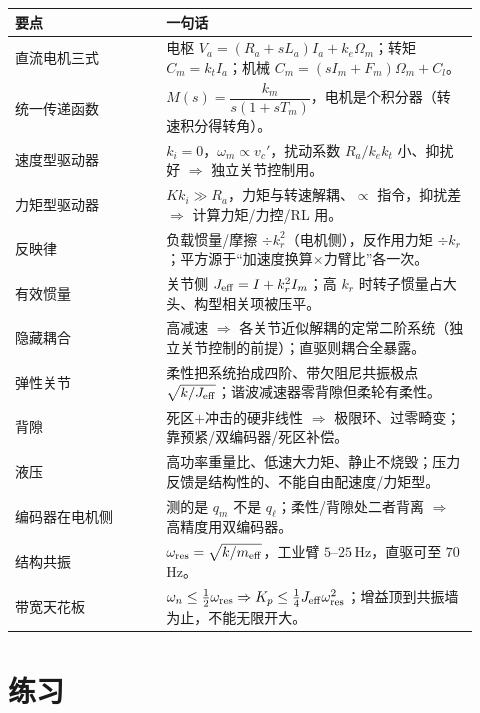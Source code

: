 \begin{center}
\begin{longtable}{p{0.30\linewidth}p{0.62\linewidth}}
\toprule
要点 & 一句话 \\
\midrule
\endhead
直流电机三式 & 电枢 $V_a=(R_a+sL_a)I_a+k_e\Omega_m$；转矩 $C_m=k_tI_a$；机械 $C_m=(sI_m+F_m)\Omega_m+C_l$。 \\
统一传递函数 & $M(s)=\dfrac{k_m}{s(1+sT_m)}$，电机是个积分器（转速积分得转角）。 \\
速度型驱动器 & $k_i=0$，$\omega_m\!\propto\!v_c'$，扰动系数 $R_a/k_ek_t$ 小、抑扰好 $\Rightarrow$ 独立关节控制用。 \\
力矩型驱动器 & $Kk_i\gg R_a$，力矩与转速解耦、$\propto$ 指令，抑扰差 $\Rightarrow$ 计算力矩/力控/RL 用。 \\
反映律 & 负载惯量/摩擦 $\div k_r^2$（电机侧），反作用力矩 $\div k_r$；平方源于“加速度换算$\times$力臂比”各一次。 \\
有效惯量 & 关节侧 $J_{\rm eff}=I+k_r^2 I_m$；高 $k_r$ 时转子惯量占大头、构型相关项被压平。 \\
隐藏耦合 & 高减速 $\Rightarrow$ 各关节近似解耦的定常二阶系统（独立关节控制的前提）；直驱则耦合全暴露。 \\
弹性关节 & 柔性把系统抬成四阶、带欠阻尼共振极点 $\sqrt{k/J_{\rm eff}}$；谐波减速器零背隙但柔轮有柔性。 \\
背隙 & 死区$+$冲击的硬非线性 $\Rightarrow$ 极限环、过零畸变；靠预紧/双编码器/死区补偿。 \\
液压 & 高功率重量比、低速大力矩、静止不烧毁；压力反馈是结构性的、不能自由配速度/力矩型。 \\
编码器在电机侧 & 测的是 $q_m$ 不是 $q_\ell$；柔性/背隙处二者背离 $\Rightarrow$ 高精度用双编码器。 \\
结构共振 & $\omega_{\rm res}=\sqrt{k/m_{\rm eff}}$，工业臂 $5$--$25\,$Hz，直驱可至 $70\,$Hz。 \\
带宽天花板 & $\omega_n\le\tfrac12\omega_{\rm res}\Rightarrow K_p\le\tfrac14 J_{\rm eff}\omega_{\rm res}^2$；增益顶到共振墙为止，不能无限开大。 \\
\bottomrule
\end{longtable}
\end{center}

\section{练习}
\label{sec:ds-exercises}

